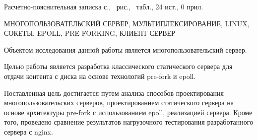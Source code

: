 
Расчетно-пояснительная записка \pageref{LastPage} с., \totalfigures\ рис., \totaltables\ табл., 24 ист., 0 прил.

МНОГОПОЛЬЗОВАТЕЛЬСКИЙ СЕРВЕР,
МУЛЬТИПЛЕКСИРОВАНИЕ,
LINUX,
СОКЕТЫ,
EPOLL,
PRE-FORKING,
КЛИЕНТ-СЕРВЕР

Объектом исследования данной работы является многопользовательский сервер.

Целью работы является разработка классического статического сервера для отдачи контента с диска на основе технологий pre-fork и epoll.

Поставленная цель достигается путем анализа способов проектирования многопользовательских серверов, проектированием статического сервера на основе архитектуры pre-fork с использованием epoll, реализацией сервера. Кроме того, проведено сравнение результатов нагрузочного тестирования разработанного сервера с nginx.


\pagebreak